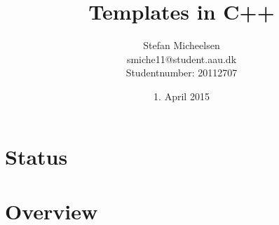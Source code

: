 


\title{Templates in C++ }
\author{Stefan Micheelsen \\smiche11@student.aau.dk \\Studentnumber: 20112707}
\date{1. April 2015}



\maketitle

\section{Status}

\section{Overview}

